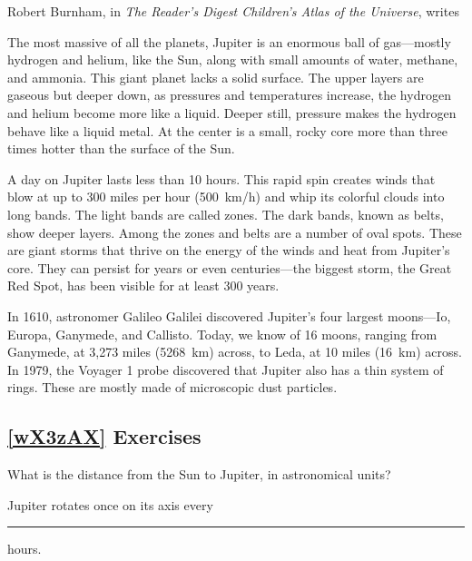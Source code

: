 \documentclass{article}
\numberwithin{equation}{section}
\numberwithin{figure}{section}
\begin{document}
\clearpage

Robert Burnham, in \textit{The Reader's Digest Children's Atlas of the Universe}, writes

\begin{displayquote}
    The most massive of all the planets, Jupiter is an enormous ball of gas---mostly hydrogen and helium, like the Sun, along with small amounts of water, methane, and ammonia. This giant planet lacks a solid surface. The upper layers are gaseous but deeper down, as pressures and temperatures increase, the hydrogen and helium become more like a liquid. Deeper still, pressure makes the hydrogen behave like a liquid metal. At the center is a small, rocky core more than three times hotter than the surface of the Sun.

    A day on Jupiter lasts less than 10 hours. This rapid spin creates winds that blow at up to 300 miles per hour (\SI{500}{km/h}) and whip its colorful clouds into long bands. The light bands are called zones. The dark bands, known as belts, show deeper layers. Among the zones and belts are a number of oval spots. These are giant storms that thrive on the energy of the winds and heat from Jupiter's core. They can persist for years or even centuries---the biggest storm, the Great Red Spot, has been visible for at least 300 years. 

    In 1610, astronomer Galileo Galilei discovered Jupiter's four largest moons---Io, Europa, Ganymede, and Callisto. Today, we know of 16 moons, ranging from Ganymede, at 3,273 miles (\SI{5268}{km}) across, to Leda, at 10 miles (\SI{16}{km}) across.  In 1979, the Voyager 1 probe discovered that Jupiter also has a thin system of rings. These are mostly made of microscopic dust particles. 
\end{displayquote}



\subsection*{\ref{wX3zAX} Exercises}

\begin{exercise}
    What is the distance from the Sun to Jupiter, in astronomical units?
\end{exercise}

\begin{exercise}
    Jupiter rotates once on its axis every \rule{1cm}{0.15mm} hours.
\end{exercise}
\end{document}
